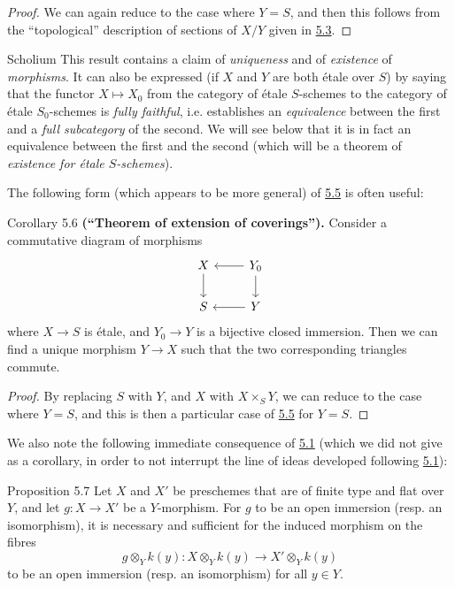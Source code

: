 \begin{proof}
  We can again reduce to the case where $Y=S$, and then this follows from the ``topological'' description of sections of $X/Y$ given in \hyperref[I.5.3]{5.3}.
\end{proof}

\begin{rmenv}{Scholium}
  This result contains a claim of \emph{uniqueness} and of \emph{existence} of \emph{morphisms}.
  It can also be expressed (if $X$ and $Y$ are both étale over $S$) by saying that the functor $X\mapsto X_0$ from the category of étale $S$-schemes to the category of étale $S_0$-schemes is \emph{fully faithful}, i.e. establishes an \emph{equivalence} between the first and a \emph{full subcategory} of the second.
  We will see below that it is in fact an equivalence between the first and the second (which will be a theorem of \emph{existence for étale $S$-schemes}).
\end{rmenv}

The following form (which appears to be more general) of \hyperref[I.5.5]{5.5} is often useful:

\begin{itenv}{Corollary 5.6}
\label{I.5.6}
  \textbf{(``Theorem of extension of coverings'').}
  Consider a commutative diagram of morphisms
  \[
    \begin{tikzcd}
      X \dar
      & Y_0 \lar \dar
    \\S
      & Y \lar
    \end{tikzcd}
  \]
  where $X\to S$ is étale, and $Y_0\to Y$ is a bijective closed immersion.
  Then we can find a unique morphism $Y\to X$ such that the two corresponding triangles commute.
\end{itenv}

\begin{proof}
  By replacing $S$ with $Y$, and $X$ with $X\times_S Y$, we can reduce to the case where $Y=S$, and this is then a particular case of \hyperref[I.5.5]{5.5} for $Y=S$.
\end{proof}

We also note the following immediate consequence of \hyperref[I.5.1]{5.1} (which we did not give as a corollary, in order to not interrupt the line of ideas developed following \hyperref[I.5.1]{5.1}):

\begin{itenv}{Proposition 5.7}
\label{I.5.7}
  Let $X$ and $X'$ be preschemes that are of finite type and flat over $Y$, and let $g\colon X\to X'$ be a $Y$-morphism.
  For $g$ to be an open immersion (resp. an isomorphism), it is necessary and sufficient for the induced morphism on the fibres
  \[
    g\otimes_Y k(y)\colon
    X\otimes_Y k(y) \to X'\otimes_Y k(y)
  \]
  to be an open immersion (resp. an isomorphism) for all $y\in Y$.
\end{itenv}

